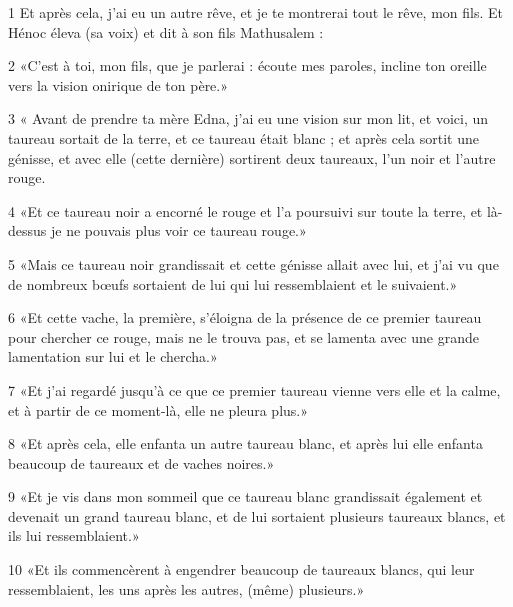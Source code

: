 \par 1 Et après cela, j'ai eu un autre rêve, et je te montrerai tout le rêve, mon fils. Et Hénoc éleva (sa voix) et dit à son fils Mathusalem :
\par 2 «C'est à toi, mon fils, que je parlerai : écoute mes paroles, incline ton oreille vers la vision onirique de ton père.»
\par 3 « Avant de prendre ta mère Edna, j'ai eu une vision sur mon lit, et voici, un taureau sortait de la terre, et ce taureau était blanc ; et après cela sortit une génisse, et avec elle (cette dernière) sortirent deux taureaux, l'un noir et l'autre rouge.
\par 4 «Et ce taureau noir a encorné le rouge et l'a poursuivi sur toute la terre, et là-dessus je ne pouvais plus voir ce taureau rouge.»
\par 5 «Mais ce taureau noir grandissait et cette génisse allait avec lui, et j'ai vu que de nombreux bœufs sortaient de lui qui lui ressemblaient et le suivaient.»
\par 6 «Et cette vache, la première, s'éloigna de la présence de ce premier taureau pour chercher ce rouge, mais ne le trouva pas, et se lamenta avec une grande lamentation sur lui et le chercha.»
\par 7 «Et j'ai regardé jusqu'à ce que ce premier taureau vienne vers elle et la calme, et à partir de ce moment-là, elle ne pleura plus.»
\par 8 «Et après cela, elle enfanta un autre taureau blanc, et après lui elle enfanta beaucoup de taureaux et de vaches noires.»
\par 9 «Et je vis dans mon sommeil que ce taureau blanc grandissait également et devenait un grand taureau blanc, et de lui sortaient plusieurs taureaux blancs, et ils lui ressemblaient.»
\par 10 «Et ils commencèrent à engendrer beaucoup de taureaux blancs, qui leur ressemblaient, les uns après les autres, (même) plusieurs.»


